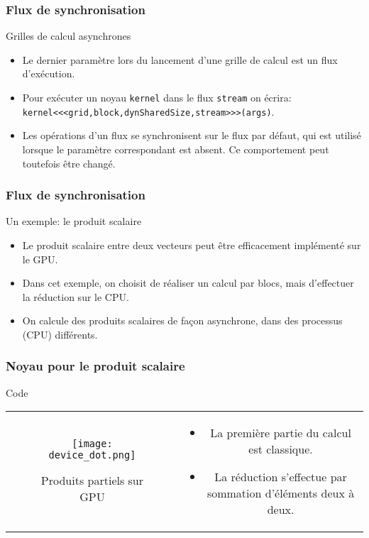\begin{frame}[fragile]
    \frametitle{Flux de synchronisation}
\begin{block}{Grilles de calcul asynchrones}
    \begin{itemize}
        \item<+-> Le dernier paramètre lors du lancement d'une grille de calcul est un flux d'exécution.
        \item<+-> Pour exécuter un noyau \texttt{kernel} dans le flux \texttt{stream} on écrira:
        \texttt{kernel<<<grid,block,dynSharedSize,stream>>>(args)}.
        \item<+-> Les opérations d'un flux se synchronisent sur le flux par défaut, qui est utilisé lorsque le paramètre correspondant est absent. Ce comportement peut toutefois être changé.
    \end{itemize}
\end{block}
\end{frame}
\begin{frame}
    \frametitle{Flux de synchronisation}
\begin{block}{Un exemple: le produit scalaire}
    \begin{itemize}
        \item<+-> Le produit scalaire entre deux vecteurs peut être efficacement implémenté sur le GPU.
        \item<+-> Dans cet exemple, on choisit de réaliser un calcul par blocs, mais d'effectuer la réduction sur 
        le CPU.
        \item<+-> On calcule des produits scalaires de façon asynchrone, dans des processus (CPU) différents.
    \end{itemize}
\end{block}
\end{frame}
\begin{frame}
    \frametitle{Noyau pour le produit scalaire}
\begin{block}{Code}
   \begin{tabular}{cc}
        \begin{minipage}{0.45\textwidth}
 \begin{figure}[htbp]
    \centering
   \texttt{[image: device\_dot.png]}
    \caption{Produits partiels sur GPU}
    \label{fig:device_dot}
\end{figure}
        \end{minipage} & 
        \begin{minipage}{0.45\textwidth}
            \begin{itemize}
                \item<+-> La première partie du calcul est classique.
                \item<+-> La réduction s'effectue par sommation d'éléments deux à deux.
           \end{itemize}
        \end{minipage}
\end{tabular}
\end{block}
\end{frame}
